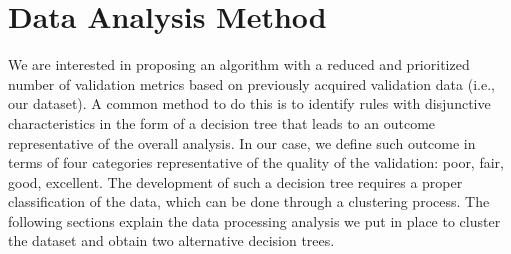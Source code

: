 
\section{Data Analysis Method} 
\label{sec:method}

We are interested in proposing an algorithm with a reduced and prioritized number of validation metrics based on previously acquired validation data (i.e., our dataset). A common method to do this is to identify rules with disjunctive characteristics in the form of a decision tree that leads to an outcome representative of the overall analysis. In our case, we define such outcome in terms of four categories representative of the quality of the validation: poor, fair, good, excellent. The development of such a decision tree requires a proper classification of the data, which can be done through a clustering process. The following sections explain the data processing analysis we put in place to cluster the dataset and obtain two alternative decision trees.




